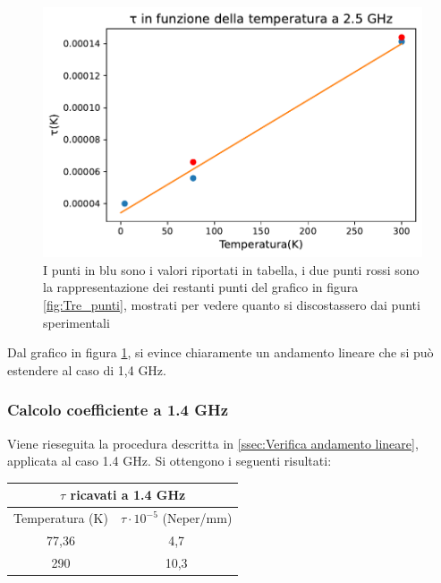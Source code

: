 \begin{figure}[H]
	\centering
	\includegraphics[scale=0.8]{Tau_Temp_2,5.pdf}
	\caption{I punti in blu sono i valori riportati in tabella, i due punti rossi sono la rappresentazione dei restanti punti del grafico in figura \ref{fig:Tre_punti}, mostrati per vedere quanto si discostassero dai punti sperimentali}
    	\label{fig:Tau_2,5}
\end{figure}

Dal grafico in figura \ref{fig:Tau_2,5}, si evince chiaramente un andamento lineare che si può estendere al caso di 1,4 GHz.

\subsubsection{Calcolo coefficiente a 1.4 GHz}
\label{ssec:Calcolo coefficiente a 1.4 GHz}

Viene rieseguita la procedura descritta in \ref{ssec:Verifica andamento lineare}, applicata al caso 1.4 GHz. Si ottengono i seguenti risultati: 

\begin{table}[H]
\centering

\begin{tabular}{ |c|c|  }
	\hline
	\multicolumn{2}{|c|}{$\tau $ ricavati a 1.4 GHz} \\
	\hline
	Temperatura (K)& $\tau\cdot  10^{-5}$ (Neper/mm) \\
	\hline
	77,36  & 4,7 \\
	290 &10,3 \\
	\hline
\end{tabular}

\end{table}


